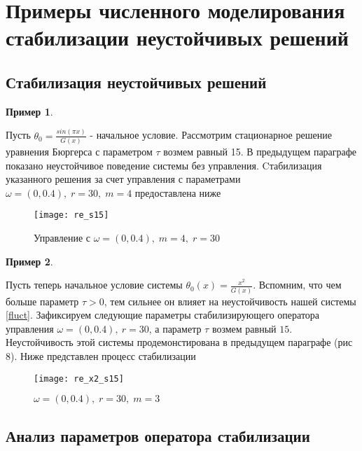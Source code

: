 \section{Примеры численного моделирования стабилизации неустойчивых решений}
\vspace{1em}

\subsection{Стабилизация неустойчивых решений}

\newtheorem{exmp_stbur}{Пример}

\begin{exmp_stbur}
\end{exmp_stbur}

Пусть $\theta_0 = \frac{sin(\pi x)}{G(x)}$ - начальное условие. Рассмотрим
стационарное решение уравнения Бюргерса с параметром $\tau$ возмем равный 15. 
В предыдущем параграфе показано неустойчивое поведение системы без управления. 
Cтабилизация указанного решения за счет управления с параметрами 
$\omega = (0, 0.4), \; r = 30, \; m = 4$ предоставлена ниже\\


\begin{figure}[H]
  \centering
  \texttt{[image: re\_s15]}
  \caption{Управление с $\omega = (0, 0.4), \; m = 4, \; r = 30$}
  \label{fig:fig09}
\end{figure}


\begin{exmp_stbur}
\end{exmp_stbur}
Пусть теперь начальное условие системы $\theta_0(x) = \frac{x^2}{G(x)}$.
Вспомним, что чем больше параметр $\tau > 0$, тем сильнее он влияет на
неустойчивость нашей системы \eqref{fluct}. Зафиксируем следующие параметры
стабилизирующего оператора управления $\omega = (0, 0.4), \ r = 30$, а параметр 
$\tau$  возмем равный $15$. Неустойчивость этой системы продемонстирована в
предыдущем параграфе (рис 8). Ниже представлен процесс стабилизации

\begin{figure}[H]
 \centering
  \texttt{[image: re\_x2\_s15]}
  \caption{$\omega = (0, 0.4), \; r = 30, \; m = 3$}
  \label{fig:fig10}
\end{figure}

\subsection{Анализ параметров оператора стабилизации}
\vspace{1em}

